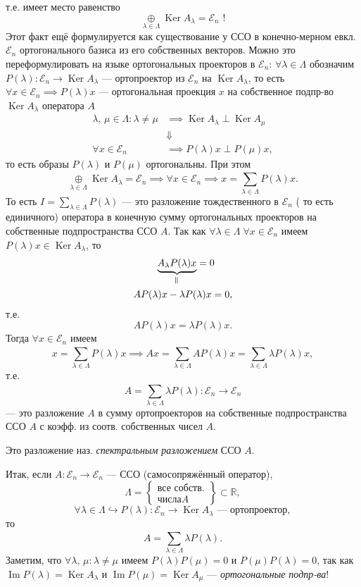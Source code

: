 \documentclass[a4paper]{article}
\begin{document}
т.\:е. имеет место равенство
\[
	\underset{\lambda \in \Lambda}{\oplus} \operatorname{Ker}
	A_\lambda = \mathcal{E}_n \text{ !}
\] 
Этот факт ещё формулируется как существование у ССО
в конечно-мерном евкл. $\mathcal{E}_n$ ортогонального базиса
из его собственных векторов. Можно это переформулировать
на языке ортогональных  проекторов в $\mathcal{E}_n$:
$\forall \lambda \in  \Lambda$ обозначим $P(\lambda):
 \mathcal{E}_n \to  \operatorname{Ker}A_\lambda$ --- ортопроектор
 из $\mathcal{E}_n$ на $\operatorname{Ker}A_\lambda$,
 то есть $\forall x \in  \mathcal{E}_n \implies P(\lambda) x$ ---
 ортогональная проекция $x$ на собственное подпр-во
$\operatorname{Ker}A_\lambda$ оператора $A$
 \begin{align*}
	  \lambda,\, \mu \in  \Lambda : \lambda \neq \mu &\implies
	 \operatorname{Ker} A_{\lambda} \perp \operatorname{Ker}A_\mu \\
&\Downarrow \\
	 \forall x \in \mathcal{E}_n &\implies P(\lambda) x
\perp P(\mu) x,\end{align*} 
то есть образы  $P(\lambda)$ и $P(\mu)$ ортогональны.
При этом 
\[
	\underset{\lambda \in \Lambda}{\oplus} \operatorname{Ker}
	A_\lambda = \mathcal{E}_n \implies \forall
	x \in \mathcal{E}_n \implies x = \sum_{\lambda \in \Lambda}^{
	} P(\lambda) x
.\] 
То есть $I = \sum_{\lambda \in \Lambda}^{} P(\lambda)$ 
--- это разложение тождественного в $\mathcal{E}_n$ ( то есть 
единичного) оператора в конечную сумму ортогональных проекторов
на собственные подпространства ССО $A$. Так как
$\forall \lambda \in  \Lambda \; \forall x \in \mathcal{E}_n$ 
имеем $P(\lambda) x \in  \operatorname{Ker}A_\lambda$, то
\begin{align*}
	\underbrace{A_\lambda P(\lambda) x}_{\veq} &= 0\\
	AP(\lambda)x - \lambda P (&\lambda) x =0
,\end{align*} 
т.\:е.
\[
	AP(\lambda) x = \lambda P(\lambda) x
.\] 
Тогда $\forall x \in  \mathcal{E}_n$ имеем
\[
	x = \sum_{\lambda \in \Lambda}^{} P(\lambda) x
	\implies Ax= \sum_{\lambda \in \Lambda}^{} A P(\lambda) x=
	\sum_{\lambda \in  \Lambda}^{} \lambda P (\lambda) x,
\] 
т.\:е.
\[
	A = \sum_{\lambda \in  \Lambda}^{} \lambda P(\lambda):
	\mathcal{E}_n \to \mathcal{E}_n
\]
--- это разложение $A$ в сумму ортопроекторов на собственные подпространства ССО $A$ с коэфф. из соотв. собственных чисел $A$.
\begin{dfn}
Это разложение наз. \emph{спектральным разложением} ССО $A$.
\end{dfn}
Итак, если $A: \mathcal{E}_n \to \mathcal{E}_{n}$ --- ССО (самосопряжённый оператор),
\[
\Lambda = \left\{ \substack{\text{все собств.}\\
\text{числа} A} \right\}  \subset \mathbb{R}
,\] 
\[
	\forall \lambda \in \Lambda \hookrightarrow P(\lambda)
	: \mathcal{E}_n \to  \operatorname{Ker}A_\lambda
\text{ --- ортопроектор}
,\] 
то
\[
	A = \sum_{\lambda \in \Lambda}^{} \lambda P(\lambda)
.\] 
Заметим, что $\forall \lambda,\,\mu : \lambda \neq \mu$ имеем
$P(\lambda)P(\mu)=0$ и $P(\mu)P(\lambda)=0$, так как
$\operatorname{Im} P(\lambda)= \operatorname{Ker}A_\lambda$ и
$\operatorname{Im}P(\mu)= \operatorname{Ker}A_\mu$ --- \emph{ортогональные подпр-ва}!
\end{document}
